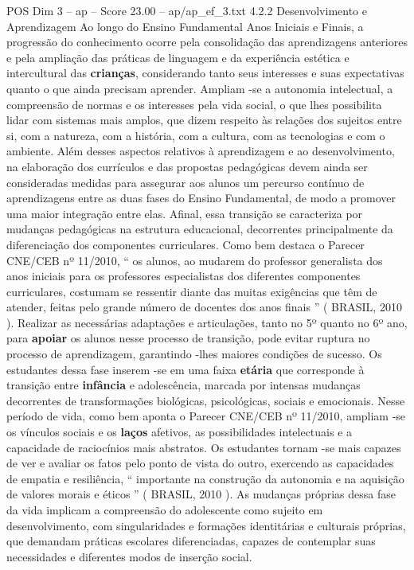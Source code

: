 \begin{textsample}{POS Dim 3 – ap – Score 23.00 – ap/ap\_ef\_3.txt}  \label{ex:f3_pos_181}
4.2.2 Desenvolvimento e Aprendizagem Ao longo do Ensino Fundamental Anos Iniciais e Finais, a progressão do conhecimento ocorre pela consolidação das aprendizagens anteriores e pela ampliação das práticas de linguagem e da experiência estética e intercultural das \textbf{crianças}, considerando tanto seus interesses e suas expectativas quanto o que ainda precisam aprender.
Ampliam -se a autonomia intelectual, a compreensão de normas e os interesses pela vida social, o que lhes possibilita lidar com sistemas mais amplos, que dizem respeito às relações dos sujeitos entre si, com a natureza, com a história, com a cultura, com as tecnologias e com o ambiente.
Além desses aspectos relativos à aprendizagem e ao desenvolvimento, na elaboração dos currículos e das propostas pedagógicas devem ainda ser consideradas medidas para assegurar aos alunos um percurso contínuo de aprendizagens entre as duas fases do Ensino Fundamental, de modo a promover uma maior integração entre elas.
Afinal, essa transição se caracteriza por mudanças pedagógicas na estrutura educacional, decorrentes principalmente da diferenciação dos componentes curriculares.
Como bem destaca o Parecer CNE/CEB nº 11/2010, “ os alunos, ao mudarem do professor generalista dos anos iniciais para os professores especialistas dos diferentes componentes curriculares, costumam se ressentir diante das muitas exigências que têm de atender, feitas pelo grande número de docentes dos anos finais ” ( BRASIL, 2010 ).
Realizar as necessárias adaptações e articulações, tanto no 5º quanto no 6º ano, para \textbf{apoiar} os alunos nesse processo de transição, pode evitar ruptura no processo de aprendizagem, garantindo -lhes maiores condições de sucesso.
Os estudantes dessa fase inserem -se em uma faixa \textbf{etária} que corresponde à transição entre \textbf{infância} e adolescência, marcada por intensas mudanças decorrentes de transformações biológicas, psicológicas, sociais e emocionais.
Nesse período de vida, como bem aponta o Parecer CNE/CEB nº 11/2010, ampliam -se os vínculos sociais e os \textbf{laços} afetivos, as possibilidades intelectuais e a capacidade de raciocínios mais abstratos.
Os estudantes tornam -se mais capazes de ver e avaliar os fatos pelo ponto de vista do outro, exercendo as capacidades de empatia e resiliência, “ importante na construção da autonomia e na aquisição de valores morais e éticos ” ( BRASIL, 2010 ).
As mudanças próprias dessa fase da vida implicam a compreensão do adolescente como sujeito em desenvolvimento, com singularidades e formações identitárias e culturais próprias, que demandam práticas escolares diferenciadas, capazes de contemplar suas necessidades e diferentes modos de inserção social.

\end{textsample}
